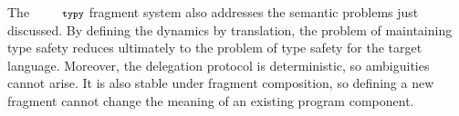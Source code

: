 \documentclass[10pt]{sigplanconf}
\newcommand{\typy}{\texttt{\footnotesize typy}}
\begin{document}
The $\typy$ fragment system also addresses the semantic problems just discussed. By defining the dynamics by translation, the problem of maintaining type safety reduces ultimately to the problem of type safety for the target language. Moreover, the delegation protocol is deterministic, so ambiguities cannot arise. It is also stable under fragment composition, so defining a new fragment cannot change the meaning of an existing program component. 


\end{document}
